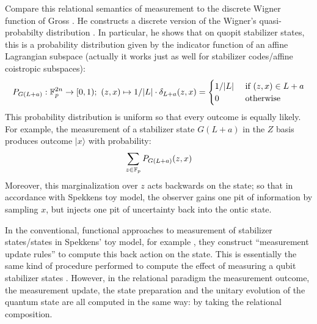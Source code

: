 \begin{remark}
Compare this relational semantics of measurement to the discrete Wigner function of Gross \cite{gross}.  He constructs a discrete version of the Wigner's quasi-probabilty distribution \cite{Wigner1932}.  In particular, he shows that on quopit stabilizer states, this is a probability distribution given by the indicator function of an affine Lagrangian subspace  \cite[Lemma 9]{gross} (actually it works just as well for stabilizer codes/affine coistropic subspaces):
$$
P_{G(L+a)}:\mathbb{F}_p^{2n}\to [0,1);\ (z,x)\mapsto
1/|L| \cdot \delta_{L+a}(z,x)
=
\begin{cases}
1/|L| & \text{ if } (z,x) \in L+a\\
0 & \text{ otherwise}
\end{cases}
$$
This probability distribution is uniform so that every outcome is equally likely.  For example, the measurement of a stabilizer state $G(L+a)$ in the $Z$ basis produces outcome $|x\rangle$ with probability:
$$
\sum_{z\in \mathbb{F}_p} P_{G(L+a)}(z,x)
$$
Moreover, this marginalization over $z$ acts backwards on the state; so that in accordance with Spekkens toy model, the observer gains one pit of information by sampling $x$, but injects one pit of uncertainty back into the ontic state.


In the conventional, functional approaches to measurement of stabilizer states/states in Spekkens' toy model, for example \cite{catani}, they construct ``measurement update rules'' to compute this back action on the state.  This is essentially the same kind of procedure performed to compute the effect of  measuring a qubit stabilizer states \cite{aaronson}.  However, in the relational paradigm the measurement outcome, the measurement update, the state preparation and the unitary evolution of the quantum state are all computed in the same way: by taking the relational composition.
\end{remark}


